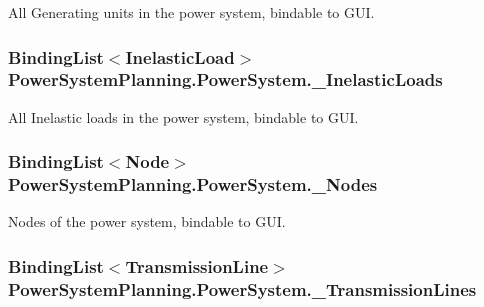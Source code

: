 All Generating units in the power system, bindable to G\+UI. 

\subsubsection[{\texorpdfstring{\+\_\+\+Inelastic\+Loads}{_InelasticLoads}}]{\setlength{\rightskip}{0pt plus 5cm}Binding\+List$<${\bf Inelastic\+Load}$>$ Power\+System\+Planning.\+Power\+System.\+\_\+\+Inelastic\+Loads}\hypertarget{class_power_system_planning_1_1_power_system_a00de0d9b9439f8b3ec25b1ac020a503d}{}\label{class_power_system_planning_1_1_power_system_a00de0d9b9439f8b3ec25b1ac020a503d}


All Inelastic loads in the power system, bindable to G\+UI. 

\subsubsection[{\texorpdfstring{\+\_\+\+Nodes}{_Nodes}}]{\setlength{\rightskip}{0pt plus 5cm}Binding\+List$<${\bf Node}$>$ Power\+System\+Planning.\+Power\+System.\+\_\+\+Nodes}\hypertarget{class_power_system_planning_1_1_power_system_afe8041cf92b81053ffc54c1ab2cd76cc}{}\label{class_power_system_planning_1_1_power_system_afe8041cf92b81053ffc54c1ab2cd76cc}


Nodes of the power system, bindable to G\+UI. 

\subsubsection[{\texorpdfstring{\+\_\+\+Transmission\+Lines}{_TransmissionLines}}]{\setlength{\rightskip}{0pt plus 5cm}Binding\+List$<${\bf Transmission\+Line}$>$ Power\+System\+Planning.\+Power\+System.\+\_\+\+Transmission\+Lines}\hypertarget{class_power_system_planning_1_1_power_system_a88e97e6852c0105b86408ff9753163ba}{}\label{class_power_system_planning_1_1_power_system_a88e97e6852c0105b86408ff9753163ba}



